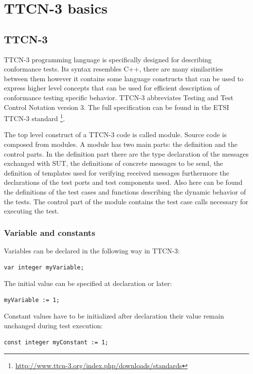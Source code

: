 \documentclass[a4paper]{article}
\begin{document}
\section{TTCN-3 basics}
\subsection{TTCN-3}
TTCN-3 programming language is specifically designed for describing conformance tests. Its syntax resembles C++, there
are many similarities between them however it contains some language constructs that can be used to express higher
level concepts that can be used for efficient description of conformance testing specific behavior. TTCN-3 
abbreviates Testing and Test Control Notation version 3. The full specification can be found in the ETSI TTCN-3
standard \cite{ttcn3}
\footnote{\url{http://www.ttcn-3.org/index.php/downloads/standards}}.

The top level construct of a TTCN-3 code is called module. Source code is composed from modules. A module has two main
parts: the definition and the control parts. In the definition part there are the type declaration of the messages exchanged
with SUT, the definitions of concrete messages to be send, the definition of templates used for verifying received
messages furthermore the declarations of the test ports and test components used. Also here can be found the
definitions of the test cases and functions describing the dynamic behavior of the tests. The control part of the
module contains the test case calls necessary for executing the test.

\subsubsection{Variable and constants}

Variables can be declared in the following way in TTCN-3:

{\footnotesize
\begin{lstlisting}
var integer myVariable;
\end{lstlisting}
}

The initial value can be specified at declaration or later:
{\footnotesize
\begin{lstlisting}
myVariable := 1;
\end{lstlisting}
}

Constant values have to be initialized after declaration their value remain unchanged during test execution:

{\footnotesize
\begin{lstlisting}
const integer myConstant := 1;
\end{lstlisting}
}
\end{document}
